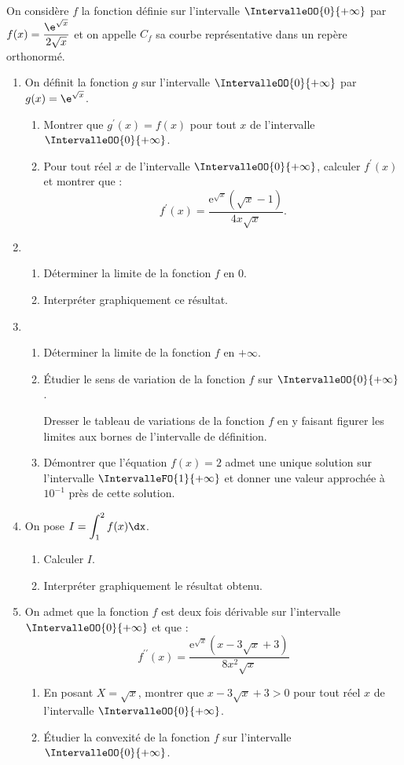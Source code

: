 On considère $f$ la fonction définie sur l'intervalle $\IntervalleOO{0}{+\infty}$ par $f(x)=\dfrac{\e^{\sqrt{x}}}{2 \sqrt{x}}$ et on appelle $C_{f}$ sa courbe représentative dans un repère orthonormé.

\begin{enumerate}
	\item On définit la fonction $g$ sur l'intervalle $\IntervalleOO{0}{+\infty}$ par $g(x)=\e^{\sqrt{x}}$.
	\begin{enumerate}
		\item Montrer que $g^{\prime}(x)=f(x)$ pour tout $x$ de l'intervalle $\IntervalleOO{0}{+\infty}$.
		\item Pour tout réel $x$ de l'intervalle $\IntervalleOO{0}{+\infty}$, calculer $f^{\prime}(x)$ et montrer que :\[ f^{\prime}(x)=\frac{\mathrm{e}^{\sqrt{x}}(\sqrt{x}-1)}{4 x \sqrt{x}}. \]
	\end{enumerate}
	\item
	\begin{enumerate}
		\item Déterminer la limite de la fonction $f$ en 0.
		\item Interpréter graphiquement ce résultat.
	\end{enumerate}
	\item
	\begin{enumerate}
		\item Déterminer la limite de la fonction $f$ en $+\infty$.
		\item Étudier le sens de variation de la fonction $f$ sur $\IntervalleOO{0}{+\infty}$.
		
		Dresser le tableau de variations de la fonction $f$ en y faisant figurer les limites aux bornes de l'intervalle de définition.
		\item Démontrer que l'équation $f(x)=2$ admet une unique solution sur l'intervalle $\IntervalleFO{1}{+\infty}$ et donner une valeur approchée à $10^{-1}$ près de cette solution.
	\end{enumerate}
	\item On pose $I=\displaystyle\int_{1}^{2} f(x) \dx$.
	\begin{enumerate}
		\item Calculer $I$.
		\item Interpréter graphiquement le résultat obtenu.
	\end{enumerate}
	\item On admet que la fonction $f$ est deux fois dérivable sur l'intervalle $\IntervalleOO{0}{+\infty}$ et que : \[ f^{\prime \prime}(x)=\frac{\mathrm{e}^{\sqrt{x}}(x-3 \sqrt{x}+3)}{8 x^{2} \sqrt{x}} \]
	\begin{enumerate}
		\item En posant $X=\sqrt{x}$, montrer que $x-3 \sqrt{x}+3>0$ pour tout réel $x$ de l'intervalle $\IntervalleOO{0}{+\infty}$.
		\item Étudier la convexité de la fonction $f$ sur l'intervalle $\IntervalleOO{0}{+\infty}$.
	\end{enumerate}
\end{enumerate}